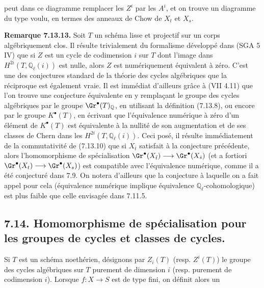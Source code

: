 peut dans ce diagramme remplacer les \(Z^i\) par les \(A^i\), et on trouve un diagramme du type voulu, en termes des anneaux de Chow de \(X_t\) et \(X_s\).

\textbf{Remarque 7.13.13.} Soit \(T\) un schéma lisse et projectif sur un corps algébriquement clos. Il résulte trivialement du formalisme développé dans (SGA 5 IV) que si \(Z\) est un cycle de codimension \(i\) sur \(T\) dont l'image dans \(H^{2i}(T,\mathbb Q_\ell(i))\) est nulle, alors \(Z\) est numériquement équivalent à zéro. C'est une des conjectures standard de la théorie des cycles algébriques que la réciproque est également vraie. Il est immédiat d'ailleurs grâce à (VII 4.11) que l'on trouve une conjecture équivalente en y remplaçant le groupe des cycles algébriques par le groupe \(\Gr^\bullet(T)_{\mathbb Q}\), en utilisant la définition (7.13.8), ou encore par le groupe \(K^\bullet(T)\), en écrivant que l'équivalence numérique à zéro d'un élément de \(K^\bullet(T)\) est équivalente à la nullité de son augmentation et de ses classes de Chern dans les \(H^{2i}(T,\mathbb Q_\ell(i))\). Ceci posé, il résulte immédiatement de la commutativité de (7.13.10) que si \(X_{\bar t}\) satisfait à la conjecture précédente, alors l'homomorphisme de spécialisation \(\Gr^\bullet(X_{\bar t})\longrightarrow \Gr^\bullet(X_{\bar s})\) (et a fortiori \(\Gr^\bullet(X_t)\longrightarrow \Gr^\bullet(X_s)\)) est compatible avec l'équivalence numérique, comme il a été conjecturé dans 7.9. On notera d'ailleurs que la conjecture à laquelle on a fait appel pour cela (équivalence numérique implique équivalence \(\mathbb Q_\ell\)-cohomologique) est plus faible que celle envisagée dans 7.11.5.

\subsection*{7.14. Homomorphisme de spécialisation pour les groupes de cycles et classes de cycles.}
Si \(T\) est un schéma noethérien, désignons par \(Z_i(T)\) (resp. \(Z^i(T)\)) le groupe des cycles algébriques sur \(T\) purement de dimension \(i\) (resp. purement de codimension \(i\)). Lorsque \(f:X\to S\) est de type fini, on définit alors un
